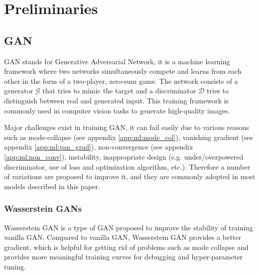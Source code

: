 \chapter{Preliminaries}
\label{chapterlabel2}

\section{GAN}

GAN stands for Generative Adversarial Network\cite{goodfellowGenerativeAdversarialNetworks2014a}, it is a machine learning framework where two networks simultaneously compete and learns from each other in the form of a two-player, zero-sum game. The network consists of a generator $\mathcal{G}$ that tries to mimic the target and a discriminator $\mathcal{D}$ tries to distinguish between real and generated input. This training framework is commonly used in computer vision tasks to generate high-quality images.

Major challenges exist in training GAN, it can fail easily due to various reasons such as mode-collapse (see appendix \ref{app:ml:mode_col}), vanishing gradient (see appendix \ref{app:ml:van_grad}), non-convergence (see appendix \ref{app:ml:non_conv}), instability, inappropriate design (e.g. under/overpowered discriminator, use of loss and optimization algorithm, etc.). Therefore a number of variations are proposed to improve it, and they are commonly adopted in most models described in this paper.


\subsection{Wasserstein GANs}
Wasserstein GAN\cite{arjovskyWassersteinGAN2017} is a type of GAN proposed to improve the stability of training vanilla GAN. Compared to vanilla GAN, Wasserstein GAN provides a better gradient, which is helpful for getting rid of problems such as mode collapse and provides more meaningful training curves for debugging and hyper-parameter tuning.

